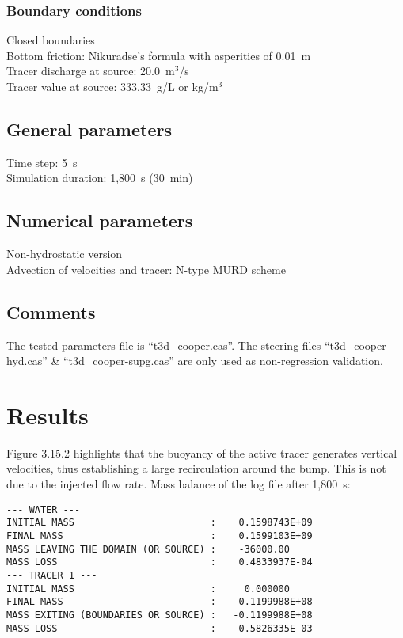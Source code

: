 \subsubsection{Boundary conditions}
Closed boundaries\\
Bottom friction: Nikuradse’s formula with asperities of 0.01~m\\
Tracer discharge at source: 20.0~m$^3$/s\\
Tracer value at source: 333.33~g/L or kg/m$^3$
%
\subsection{General parameters}
%
Time step: 5~s\\
Simulation duration: 1,800~s (30~min)
%
%
%
\subsection{Numerical parameters}
%
Non-hydrostatic version\\
Advection of velocities and tracer: N-type MURD scheme
%
\subsection{Comments}
%
The tested parameters file is “t3d\_cooper.cas”.
The steering files “t3d\_cooper-hyd.cas” \& “t3d\_cooper-supg.cas”
are only used as non-regression validation.
%
%
%
\section{Results}
%
Figure 3.15.2 highlights that the buoyancy of the active tracer generates vertical velocities,
thus establishing a large recirculation around the bump.
This is not due to the injected flow rate.
Mass balance of the log file after 1,800~s:
\begin{lstlisting}[language=TelFortran]
--- WATER ---
INITIAL MASS                        :    0.1598743E+09
FINAL MASS                          :    0.1599103E+09
MASS LEAVING THE DOMAIN (OR SOURCE) :    -36000.00    
MASS LOSS                           :    0.4833937E-04
--- TRACER 1 ---
INITIAL MASS                        :     0.000000    
FINAL MASS                          :    0.1199988E+08
MASS EXITING (BOUNDARIES OR SOURCE) :   -0.1199988E+08
MASS LOSS                           :   -0.5826335E-03
\end{lstlisting}

